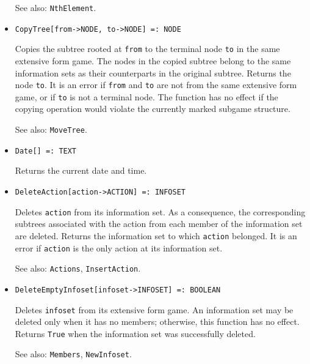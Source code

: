 \begin{itemize}
{\it for all types} {\tt T}
\bd
Returns \verb+True+ when the value \verb+x+ is contained in \verb+list+.
\item [See also:] \verb+NthElement+.
\ed

\item{}
\protect \large \begin{verbatim}
CopyTree[from->NODE, to->NODE] =: NODE 
\end{verbatim}\normalsize

\bd
Copies the subtree rooted at \verb+from+ to the terminal
node \verb+to+ in the same extensive form game.  The nodes in the
copied subtree belong to the same information sets as their counterparts in
the original subtree.  Returns the node \verb+to+.  It is an error if
\verb+from+ and \verb+to+ are not from the same extensive form game,
or if \verb+to+ is not a terminal node.  The function has no effect if
the copying operation would violate the currently marked subgame
structure.

\item
[See also:] \verb+MoveTree+.
\ed


\item{}
\protect \large \begin{verbatim}
Date[] =: TEXT 
\end{verbatim}\normalsize

\bd
Returns the current date and time. 
\ed

\item{}
\protect \large \begin{verbatim}
DeleteAction[action->ACTION] =: INFOSET 
\end{verbatim}\normalsize

\bd
Deletes \verb+action+ from its information set. 
As a consequence, the corresponding subtrees associated
with the action from each member of the information set are deleted.
Returns the information set to which \verb+action+ belonged.  It is an
error if \verb+action+ is the only action at its information set.
\item [See also:] \verb+Actions+, \verb+InsertAction+.
\ed

\item{}
\protect \large \begin{verbatim}
DeleteEmptyInfoset[infoset->INFOSET] =: BOOLEAN 
\end{verbatim}\normalsize

\bd
Deletes \verb+infoset+ from its extensive form game.  An information set
may be deleted only when it has no members; otherwise, this function has
no effect.  Returns \verb+True+ when the information set was successfully
deleted.
\item [See also:] \verb+Members+, \verb+NewInfoset+.
\ed


\end{itemize}
